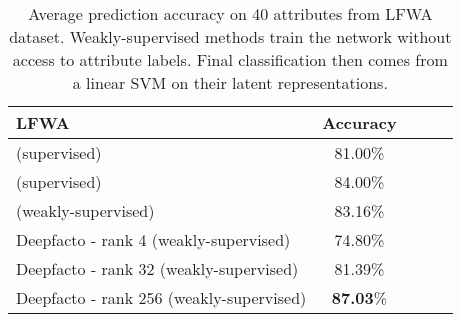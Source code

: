 \begin{table}[t]
\caption{Average prediction accuracy on 40 attributes from LFWA dataset. Weakly-supervised methods train the network without access to attribute labels. Final classification then comes from a linear SVM on their latent representations.}
\label{table:lfw}
\begin{center}
\begin{small}
\begin{sc}
\begin{tabular}{lcccr}
\toprule
LFWA & Accuracy \\
\midrule
\cite{zhang2014panda} {\tiny (supervised)}                      &  81.00\%\\
\cite{liu2015deep} {\tiny (supervised)}                         &  84.00\%\\
\cite{liu2018exploring}  {\tiny (weakly-supervised)}             &  83.16\%\\
Deepfacto - rank 4 {\tiny (weakly-supervised)}                   & 74.80\%\\
Deepfacto - rank 32 {\tiny (weakly-supervised)}                  & 81.39\%\\
Deepfacto - rank 256 {\tiny (weakly-supervised)}                 & \textbf{87.03}\%\\
\bottomrule
\end{tabular}
\end{sc}
\end{small}
\end{center}
\end{table}





